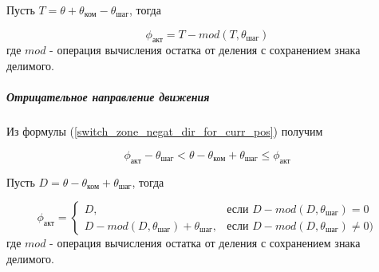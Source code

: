 Пусть $T = \theta + \theta_\textit{ком} - \theta_\textit{шаг}$, тогда

\begin{equation}
    \label{sync_restore_posit_dir_active_pole_pos}
    \phi_\textit{акт} = T - mod(T, \theta_\textit{шаг})
\end{equation}
где $mod$ - операция вычисления остатка от деления с сохранением знака делимого.

\subparagraph{Отрицательное направление движения}
Из формулы (\ref{switch_zone_negat_dir_for_curr_pos}) получим

\begin{equation}
    \label{sync_restore_negat_dir_active_pole_pos_conditions}
    \phi_\textit{акт} - \theta_\textit{шаг}
    < \theta - \theta_\textit{ком} + \theta_\textit{шаг}
    \leq \phi_\textit{акт}
\end{equation}

Пусть $D = \theta - \theta_\textit{ком} + \theta_\textit{шаг}$, тогда

\begin{equation}
    \label{sync_restore_negat_dir_active_pole_pos}
    \phi_\textit{акт} =
        \begin{cases}
            D,                                                      & \mbox{если } D - mod(D, \theta_\textit{шаг}) = 0 \\
            D - mod(D, \theta_\textit{шаг}) + \theta_\textit{шаг},  & \mbox{если } D - mod(D, \theta_\textit{шаг}) \ne 0)
        \end{cases}
\end{equation}
где $mod$ - операция вычисления остатка от деления с сохранением знака делимого.
